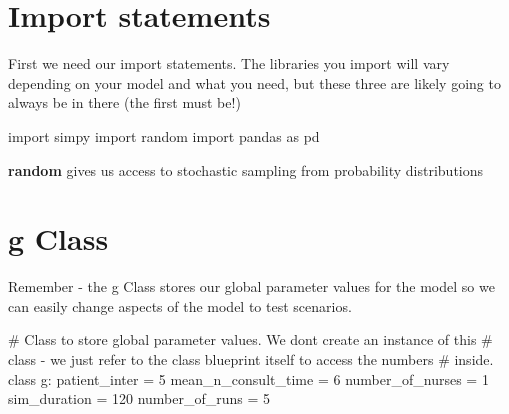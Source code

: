 \documentclass[
  letterpaper,
  DIV=11,
  numbers=noendperiod]{scrreprt}
\newenvironment{Shaded}{}{}
\newcommand{\CommentTok}[1]{\textcolor[rgb]{0.42,0.45,0.49}{#1}}
\newcommand{\DecValTok}[1]{\textcolor[rgb]{0.00,0.36,0.77}{#1}}
\newcommand{\ImportTok}[1]{\textcolor[rgb]{0.01,0.18,0.38}{#1}}
\newcommand{\KeywordTok}[1]{\textcolor[rgb]{0.84,0.23,0.29}{#1}}
\newcommand{\NormalTok}[1]{\textcolor[rgb]{0.14,0.16,0.18}{#1}}
\newcommand{\OperatorTok}[1]{\textcolor[rgb]{0.14,0.16,0.18}{#1}}
\begin{document}
\section{Import statements}\label{import-statements}

First we need our import statements. The libraries you import will vary
depending on your model and what you need, but these three are likely
going to always be in there (the first must be!)

\begin{Shaded}
\begin{Highlighting}[]
\ImportTok{import}\NormalTok{ simpy}
\ImportTok{import}\NormalTok{ random}
\ImportTok{import}\NormalTok{ pandas }\ImportTok{as}\NormalTok{ pd}
\end{Highlighting}
\end{Shaded}

\begin{tcolorbox}[enhanced jigsaw, colframe=quarto-callout-tip-color-frame, bottomtitle=1mm, breakable, rightrule=.15mm, coltitle=black, colbacktitle=quarto-callout-tip-color!10!white, opacityback=0, leftrule=.75mm, arc=.35mm, toptitle=1mm, title=\textcolor{quarto-callout-tip-color}{\faLightbulb}\hspace{0.5em}{Tip}, titlerule=0mm, colback=white, toprule=.15mm, bottomrule=.15mm, left=2mm, opacitybacktitle=0.6]

\textbf{random} gives us access to stochastic sampling from probability
distributions

\end{tcolorbox}

\section{g Class}\label{g-class-1}

Remember - the g Class stores our global parameter values for the model
so we can easily change aspects of the model to test scenarios.

\begin{Shaded}
\begin{Highlighting}[]
\CommentTok{\# Class to store global parameter values.  We don\textquotesingle{}t create an instance of this}
\CommentTok{\# class {-} we just refer to the class blueprint itself to access the numbers}
\CommentTok{\# inside.}
\KeywordTok{class}\NormalTok{ g:}
\NormalTok{    patient\_inter }\OperatorTok{=} \DecValTok{5}
\NormalTok{    mean\_n\_consult\_time }\OperatorTok{=} \DecValTok{6}
\NormalTok{    number\_of\_nurses }\OperatorTok{=} \DecValTok{1}
\NormalTok{    sim\_duration }\OperatorTok{=} \DecValTok{120}
\NormalTok{    number\_of\_runs }\OperatorTok{=} \DecValTok{5}
\end{Highlighting}
\end{Shaded}
\end{document}
